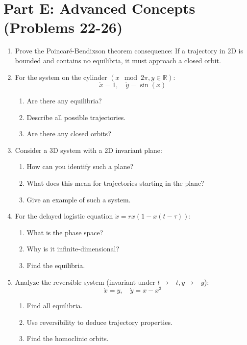 \documentclass[12pt]{article}
\begin{document}
\section*{Part E: Advanced Concepts (Problems 22-26)}

\begin{enumerate}[resume]
\item Prove the Poincaré-Bendixson theorem consequence:
If a trajectory in 2D is bounded and contains no equilibria, it must approach a closed orbit.

\item For the system on the cylinder $(x \mod 2\pi, y \in \mathbb{R})$:
$$\dot{x} = 1, \quad \dot{y} = \sin(x)$$
\begin{enumerate}[label=(\alph*)]
    \item Are there any equilibria?
    \item Describe all possible trajectories.
    \item Are there any closed orbits?
\end{enumerate}

\item Consider a 3D system with a 2D invariant plane:
\begin{enumerate}[label=(\alph*)]
    \item How can you identify such a plane?
    \item What does this mean for trajectories starting in the plane?
    \item Give an example of such a system.
\end{enumerate}

\item For the delayed logistic equation $\dot{x} = rx(1 - x(t-\tau))$:
\begin{enumerate}[label=(\alph*)]
    \item What is the phase space?
    \item Why is it infinite-dimensional?
    \item Find the equilibria.
\end{enumerate}

\item Analyze the reversible system (invariant under $t \to -t, y \to -y$):
$$\dot{x} = y, \quad \dot{y} = x - x^3$$
\begin{enumerate}[label=(\alph*)]
    \item Find all equilibria.
    \item Use reversibility to deduce trajectory properties.
    \item Find the homoclinic orbits.
\end{enumerate}
\end{enumerate}
\end{document}
